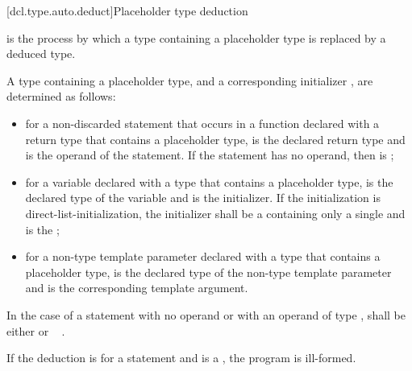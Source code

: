 [dcl.type.auto.deduct]{Placeholder type deduction}
%

\pnum
{}
is the process by which
a type containing a placeholder type
is replaced by a deduced type.

\pnum
A type  containing a placeholder type,
and a corresponding initializer ,
are determined as follows:
\begin{itemize}
\item
for a non-discarded  statement that occurs
in a function declared with a return type
that contains a placeholder type,
 is the declared return type
and  is the operand of the  statement.
If the  statement
has no operand,
then  is ;
\item
for a variable declared with a type
that contains a placeholder type,
 is the declared type of the variable
and  is the initializer.
If the initialization is direct-list-initialization,
the initializer shall be a 
containing only a single 
and  is the ;
\item
for a non-type template parameter declared with a type
that contains a placeholder type,
 is the declared type of the non-type template parameter
and  is the corresponding template argument.
\end{itemize}

In the case of a  statement with no operand
or with an operand of type ,
 shall be either
  or
\cv{}~ .

\pnum
If the deduction is for a  statement
and  is a ,
the program is ill-formed.

